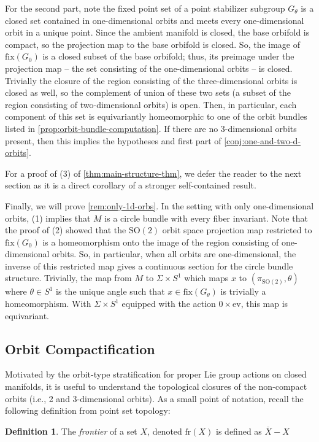 \documentclass[10pt, oneside]{article}
\newcommand{\SO}[1][2]{\text{SO}(#1)}
\newcommand{\cl}[1]{\overline{#1}}
\theoremstyle{definition}
\newtheorem{defn}{Definition}[section]
\theoremstyle{definition}
\begin{document}
For the second part, note the fixed point set of a point stabilizer subgroup $G_\theta$ is a closed set contained in one-dimensional orbits and meets every one-dimensional orbit in a unique point. Since the ambient manifold is closed, the base orbifold is compact, so the projection map to the base orbifold is closed. So, the image of $\text{fix}(G_0)$ is a closed subset of the base orbifold; thus, its preimage under the projection map -- the set consisting of the one-dimensional orbits -- is closed. Trivially the closure of the region consisting of the three-dimensional orbits is closed as well, so the complement of union of these two sets (a subset of the region consisting of two-dimensional orbits) is open. Then, in particular, each component of this set is equivariantly homeomorphic to one of the orbit bundles listed in \cref{prop:orbit-bundle-computation}. If there are no 3-dimensional orbits present, then this implies the hypotheses and first part of \cref{conj:one-and-two-d-orbits}. 

For a proof of (3) of \cref{thm:main-structure-thm}, we defer the reader to the next section as it is a direct corollary of a stronger self-contained result.

Finally, we will prove \cref{rem:only-1d-orbs}. In the setting with only one-dimensional orbits, (1) implies that $M$ is a circle bundle with every fiber invariant. Note that the proof of (2) showed that the $\SO$ orbit space projection map restricted to $\text{fix}(G_0)$ is a homeomorphism onto the image of the region consisting of one-dimensional orbits. So, in particular, when all orbits are one-dimensional, the inverse of this restricted map gives a continuous section for the circle bundle structure. Trivially, the map from $M$ to $\Sigma \times S^1$  which maps $x$ to $(\pi_{\SO}, \theta)$ where $\theta\in S^1$ is the unique angle such that $x\in\text{fix}(G_\theta)$
is trivially a homeomorphism. With $\Sigma \times S^1$ equipped with the action $0\times \text{ev}$, this map is equivariant.

\subsection{Orbit Compactification}
Motivated by the orbit-type stratification for proper Lie group actions on closed manifolds, it is useful to understand the topological closures of the non-compact orbits (i.e., 2 and 3-dimensional orbits). As a small point of notation, recall the following definition from point set topology:
\begin{defn}
    The {\it frontier} of a set $X$, denoted $\text{fr}(X)$ is defined as $\cl{X}-X$
\end{defn}
\end{document}
